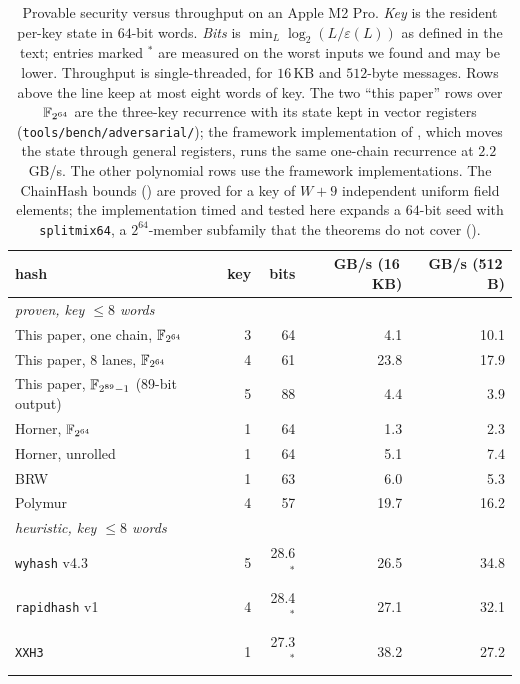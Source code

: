 \begin{table}[!htbp]
\centering
\caption{Provable security versus throughput on an Apple M2 Pro.
\emph{Key} is the resident per-key state in $64$-bit words.  \emph{Bits} is
$\min_L\log_2(L/\varepsilon(L))$ as defined in the text; entries marked $^*$
are measured on the worst inputs we found and may be lower.  Throughput is
single-threaded, for $16$\,KB and $512$-byte messages.  Rows above the line
keep at most eight words of key.  The two ``this paper'' rows over
$\mathbb{F}_{2^{64}}$ are the three-key recurrence with its state kept in vector
registers (\texttt{tools/bench/adversarial/}); the framework implementation of
, which moves the state through general
registers, runs the same one-chain recurrence at $2.2$\,GB/s.  The other
polynomial rows use the framework implementations.  The ChainHash bounds
() are proved for a key of $W+9$ independent uniform field
elements; the implementation timed and tested here expands a $64$-bit seed
with \texttt{splitmix64}, a $2^{64}$-member subfamily that the theorems do
not cover ().}
\label{tab:injective:adversarial}
\begin{tabular}{lrrrr}
\hline
hash & key & bits & GB/s (16\,KB) & GB/s (512\,B) \\
\hline
\multicolumn{5}{l}{\emph{proven, key $\le 8$ words}} \\
This paper, one chain, $\mathbb{F}_{2^{64}}$        & 3 & 64 &  4.1 & 10.1 \\
This paper, 8 lanes, $\mathbb{F}_{2^{64}}$          & 4 & 61 & 23.8 & 17.9 \\
This paper, $\mathbb{F}_{2^{89}-1}$ (89-bit output) & 5 & 88 &  4.4 &  3.9 \\
Horner, $\mathbb{F}_{2^{64}}$                       & 1 & 64 &  1.3 &  2.3 \\
Horner, unrolled                            & 1 & 64 &  5.1 &  7.4 \\
BRW~\cite{Bernstein:2011:RW}                & 1 & 63 &  6.0 &  5.3 \\
Polymur~\cite{polymur}                      & 4 & 57 & 19.7 & 16.2 \\
\multicolumn{5}{l}{\emph{heuristic, key $\le 8$ words}} \\
\texttt{wyhash} v4.3                        & 5 & 28.6$^*$ & 26.5 & 34.8 \\
\texttt{rapidhash} v1                       & 4 & 28.4$^*$ & 27.1 & 32.1 \\
\texttt{XXH3}                               & 1 & 27.3$^*$ & 38.2 & 27.2 \\

\end{tabular}
\end{table}
